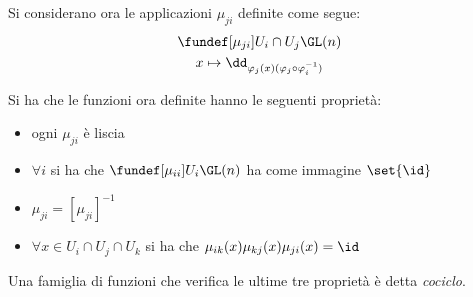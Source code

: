 Si considerano ora le applicazioni $\mu_{ji}$ definite come segue:
\begin{gather*}
\fundef[\mu_{ji}]{U_i\cap U_j}{\GL(n)} \\
x \mapsto \dd_{\varphi_j(x)(\varphi _j \circ \varphi _i ^{-1})}
\end{gather*}

\begin{oss}
Si ha che le funzioni ora definite hanno le seguenti proprietà:
\begin{itemize}
\item ogni $\mu_{ji}$ è liscia
\item $\forall i$ si ha che $\fundef[\mu_{ii}]{U_i}{\GL(n)}$ ha come immagine $\set{\id}$
\item $\mu_{ji} = [\mu_{ji}]^{-1}$
\item $\forall x \in U_i\cap U_j\cap U_k$ si ha che $\mu_{ik}(x)\mu_{kj}(x)\mu_{ji}(x) = \id$
\end{itemize}
Una famiglia di funzioni che verifica le ultime tre proprietà è detta \emph{cociclo}.
\end{oss}

